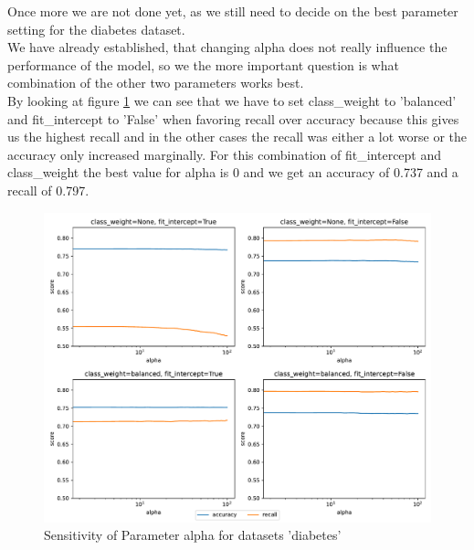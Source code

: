 \documentclass[a4paper,10pt]{article}
\begin{document}
Once more we are not done yet, as we still need to decide on the best parameter setting for the diabetes dataset.\\
We have already established, that changing \textsf{alpha} does not really influence the performance of the model, so we the more important question is what combination of the other two parameters works best.\\
By looking at figure \ref{fig:sensitivity ridge diabetes} we can see that we have to set \textsf{class\_weight} to 'balanced' and \textsf{fit\_intercept} to 'False' when favoring recall over accuracy because this gives us the highest recall and in the other cases the recall was either a lot worse or the accuracy only increased marginally. For this combination of \textsf{fit\_intercept} and \textsf{class\_weight} the best value for alpha is 0 and we get an accuracy of 0.737 and a recall of 0.797.%

\begin{figure}[h!]
    \centering
    \includegraphics[width=\textwidth]{diabetes/plots/ridge_parameter_sensitivity.pdf}
    \caption{Sensitivity of Parameter alpha for datasets 'diabetes'}
    \label{fig:sensitivity ridge diabetes}
    \end{figure}
\end{document}
